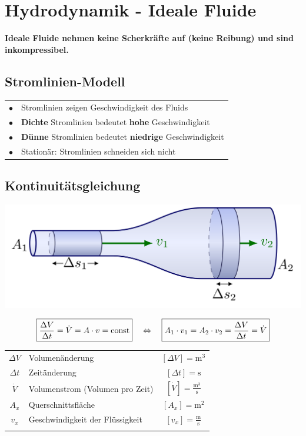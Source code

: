 \vfill\null
\columnbreak




\section{Hydrodynamik - Ideale Fluide}

\textbf{Ideale Fluide nehmen keine Scherkräfte auf (keine Reibung) und sind inkompressibel.}

\subsection{Stromlinien-Modell}

\begin{tabular}{ll}
$\bullet$ & Stromlinien zeigen Geschwindigkeit des Fluids \\
$\bullet$ & \textbf{Dichte} Stromlinien bedeutet \textbf{hohe} Geschwindigkeit \\
$\bullet$ & \textbf{Dünne} Stromlinien bedeutet \textbf{niedrige} Geschwindigkeit \\
$\bullet$ & Stationär: Stromlinien schneiden sich nicht 
\end{tabular}




\subsection{Kontinuitätsgleichung}


\includegraphics[width=0.7\linewidth]{Bilder/Kontinuitaet.png}


$$ \boxed{ \frac{\Delta V}{\Delta t} = \dot{V} = A \cdot v = \mathrm{const} } \quad \Leftrightarrow \quad \boxed{  A_1 \cdot v_1 = A_2 \cdot v_2 = \frac{\Delta V}{\Delta t} = \dot{V}} $$ 

\begin{tabular}{c l c}
		$\Delta V$ & Volumenänderung & $[\Delta V] = \mathrm{m^3}$ \\
		$\Delta t$ & Zeitänderung & $[\Delta t] = \mathrm{s}$  \\
		\rule{0pt}{8pt}$\dot{V}$ & Volumenstrom (Volumen pro Zeit) & $[\dot{V}] = \mathrm{\frac{m^3}{s}}$ \\
		$A_x$ & Querschnittsfläche & $[A_x] = \mathrm{m^2}$ \\
		\rule{0pt}{8pt}$v_x$ & Geschwindigkeit der Flüssigkeit & $[v_x] = \mathrm{\frac{m}{s}}$ \\
		\\
	\end{tabular}

